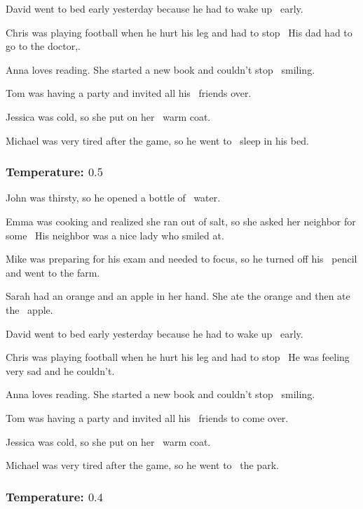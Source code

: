 \documentclass[11pt]{article}
\begin{document}
    David went to bed early yesterday because he had to wake up \textellipsis\ early.

    Chris was playing football when he hurt his leg and had to stop \textellipsis\  His dad had to go to the doctor,.

    Anna loves reading. She started a new book and couldn't stop \textellipsis\ smiling.

    Tom was having a party and invited all his \textellipsis\ friends over.

    Jessica was cold, so she put on her \textellipsis\ warm coat.

    Michael was very tired after the game, so he went to \textellipsis\ sleep in his bed.

    \subsubsection*{Temperature: $0.5$}

    John was thirsty, so he opened a bottle of \textellipsis\ water.

    Emma was cooking and realized she ran out of salt, so she asked her neighbor for some \textellipsis\  His neighbor was a nice lady who smiled at.

    Mike was preparing for his exam and needed to focus, so he turned off his \textellipsis\ pencil and went to the farm.

    Sarah had an orange and an apple in her hand. She ate the orange and then ate the \textellipsis\ apple.

    David went to bed early yesterday because he had to wake up \textellipsis\ early.

    Chris was playing football when he hurt his leg and had to stop \textellipsis\  He was feeling very sad and he couldn't.

    Anna loves reading. She started a new book and couldn't stop \textellipsis\ smiling.

    Tom was having a party and invited all his \textellipsis\ friends to come over.

    Jessica was cold, so she put on her \textellipsis\ warm coat.

    Michael was very tired after the game, so he went to \textellipsis\ the park.

    \subsubsection*{Temperature: $0.4$}
\end{document}
